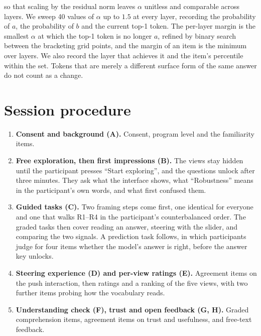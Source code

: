 \documentclass[sigconf]{acmart}
\begin{document}
so that scaling by the residual norm leaves $\alpha$ unitless and comparable across layers. We sweep 40 values
of $\alpha$ up to $1.5$ at every layer, recording the probability of $a$, the probability of $b$ and the
current top-1 token. The per-layer margin is the smallest $\alpha$ at which the top-1 token is no longer $a$,
refined by binary search between the bracketing grid points, and the margin of an item is the minimum over
layers. We also record the layer that achieves it and the item's percentile within the set. Tokens that are
merely a different surface form of the same answer do not count as a change.

\section{Session procedure}
\label{app:procedure}

\begin{enumerate}
  \item \textbf{Consent and background (A).} Consent, program level and the familiarity items.
  \item \textbf{Free exploration, then first impressions (B).} The views stay hidden until the participant
    presses ``Start exploring'', and the questions unlock after three minutes. They ask what the interface
    shows, what ``Robustness'' means in the participant's own words, and what first confused them.
  \item \textbf{Guided tasks (C).} Two framing steps come first, one identical for everyone and one that walks
    R1--R4 in the participant's counterbalanced order. The graded tasks then cover reading an answer, steering
    with the slider, and comparing the two signals. A prediction task follows, in which participants judge for
    four items whether the model's answer is right, before the answer key unlocks.
  \item \textbf{Steering experience (D) and per-view ratings (E).} Agreement items on the push interaction,
    then ratings and a ranking of the five views, with two further items probing how the vocabulary reads.
  \item \textbf{Understanding check (F), trust and open feedback (G, H).} Graded comprehension items, agreement
    items on trust and usefulness, and free-text feedback.
\end{enumerate}



\end{document}
